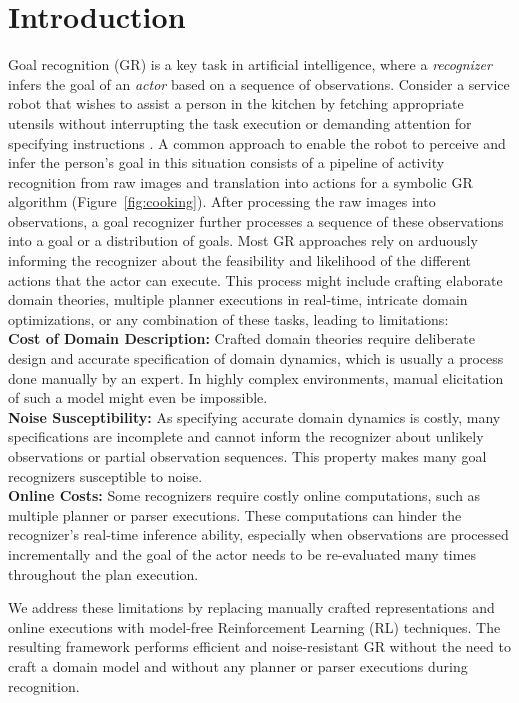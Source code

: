 \documentclass[letterpaper]{article} %
\begin{document}
\section*{Introduction}
\label{sec:intro}
Goal recognition (GR) is a key task in artificial intelligence, where a \textit{recognizer} infers the goal of an \textit{actor} based on a sequence of observations.
Consider a service robot that wishes to assist a person in the kitchen by fetching appropriate utensils without interrupting the task execution or demanding attention for specifying instructions \cite{kautz1986generalized,Monteiro2017,granada2020object,bishop2020chaopt}.
A common approach to enable the robot to perceive and infer the person's goal in this situation consists of a pipeline of activity recognition from raw images and translation into actions for a symbolic GR algorithm (Figure~\ref{fig:cooking}).
After processing the raw images into observations, a goal recognizer further processes a sequence of these observations into a goal or a distribution of goals.
Most GR approaches rely on arduously informing the recognizer about the feasibility and likelihood of the different actions that the actor can execute.
This process might include crafting elaborate domain theories, multiple planner executions in real-time, intricate domain optimizations, or any combination of these tasks, leading to limitations:\\
%
%
%
%
%
%
%
%
\textbf{Cost of Domain Description:} Crafted domain theories require deliberate design and accurate specification of domain dynamics, which is usually a process done manually by an expert.
In highly complex environments, manual elicitation of such a model might even be impossible.\\
\textbf{Noise Susceptibility:} As specifying accurate domain dynamics is costly, many specifications are incomplete and cannot inform the recognizer about unlikely observations or partial observation sequences.
This property makes many goal recognizers susceptible to noise. \\
\textbf{Online Costs:} Some recognizers require costly online computations, such as multiple planner or parser executions. These computations can hinder the recognizer's real-time inference ability, especially when observations are processed incrementally and the goal of the actor needs to be re-evaluated many times throughout the plan execution.

We address these limitations by replacing manually crafted representations and online executions with model-free Reinforcement Learning (RL) techniques.
The resulting framework performs efficient and noise-resistant GR without the need to craft a domain model and without any planner or parser executions during recognition.
\end{document}
